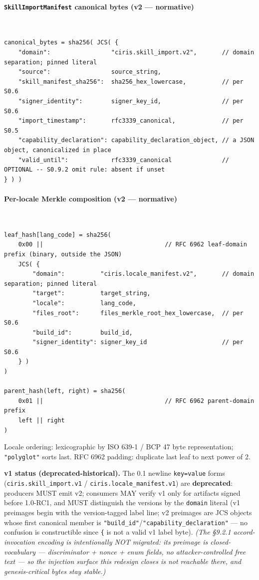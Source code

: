 \documentclass[11pt]{article}
\begin{document}
\paragraph{\texttt{SkillImportManifest} canonical bytes (v2 — normative)}\mbox{}\\


\begin{lstlisting}
canonical_bytes = sha256( JCS( {
    "domain":                 "ciris.skill_import.v2",       // domain separation; pinned literal
    "source":                 source_string,
    "skill_manifest_sha256":  sha256_hex_lowercase,          // per S0.6
    "signer_identity":        signer_key_id,                 // per S0.6
    "import_timestamp":       rfc3339_canonical,             // per S0.5
    "capability_declaration": capability_declaration_object, // a JSON object, canonicalized in place
    "valid_until":            rfc3339_canonical              // OPTIONAL -- S0.9.2 omit rule: absent if unset
} ) )
\end{lstlisting}


\paragraph{Per-locale Merkle composition (v2 — normative)}\mbox{}\\


\begin{lstlisting}
leaf_hash[lang_code] = sha256(
    0x00 ||                                  // RFC 6962 leaf-domain prefix (binary, outside the JSON)
    JCS( {
        "domain":          "ciris.locale_manifest.v2",       // domain separation; pinned literal
        "target":          target_string,
        "locale":          lang_code,
        "files_root":      files_merkle_root_hex_lowercase,  // per S0.6
        "build_id":        build_id,
        "signer_identity": signer_key_id                     // per S0.6
    } )
)

parent_hash(left, right) = sha256(
    0x01 ||                                  // RFC 6962 parent-domain prefix
    left || right
)
\end{lstlisting}

Locale ordering: lexicographic by ISO 639-1 / BCP 47 byte representation; \texttt{"polyglot"} sorts last. RFC 6962 padding: duplicate last leaf to next power of 2.


\textbf{v1 status (deprecated-historical).} The 0.1 newline \texttt{key=value} forms (\texttt{ciris.skill\_import.v1} / \texttt{ciris.locale\_manifest.v1}) are \textbf{deprecated}: producers MUST emit v2; consumers MAY verify v1 only for artifacts signed before 1.0-RC1, and MUST distinguish the versions by the \texttt{domain} literal (v1 preimages begin with the version-tagged label line; v2 preimages are JCS objects whose first canonical member is \texttt{"build\_id"}/\texttt{"capability\_declaration"} — no confusion is constructible since \texttt{\{} is not a valid v1 label byte). \textit{(The §9.2.1 accord-invocation encoding is intentionally NOT migrated: its preimage is closed-vocabulary — discriminator + nonce + enum fields, no attacker-controlled free text — so the injection surface this redesign closes is not reachable there, and genesis-critical bytes stay stable.)}
\end{document}
